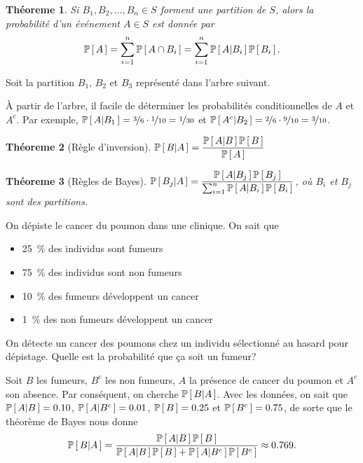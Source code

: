 \documentclass[11pt]{article}
\renewcommand\P[1]{%
	\ensuremath{%
		\mathbb{P}\left[\,#1\,\right]%
	}%
}%
\newcommand\Pg[2]{%
	\ensuremath{%
		\mathbb{P}\left[\,#1\middle\rvert#2\,\right]%
	}%
}%
\newtheorem{theoreme}{Théoreme}[section]
\theoremstyle{remark}
\theoremstyle{definition}
\begin{document}
\begin{theoreme}
	Si $B_1,B_2,\dots,B_n\in S$ forment une partition de $S$, alors la
	probabilité d'un événement $A\in S$ est donnée par
	\begin{equation*}
		\P{A}=\sum_{i=1}^n\P{A\cap B_i}=\sum_{i=1}^n\Pg{A}{B_i}\P{B_i}.
	\end{equation*}
\end{theoreme}

\begin{exemple}
	Soit la partition $B_1$, $B_2$ et $B_3$ représenté dans l'arbre suivant.
	\begin{figure}[H]
		\centering
		
	\end{figure}

	À partir de l'arbre, il facile de déterminer les probabilités
	conditionnelles de $A$ et $A^c$. Par exemple,
	$\Pg{A}{B_1}=\nicefrac{3}{6}\cdot\nicefrac{1}{10}=\nicefrac{1}{30}$ et
	$\Pg{A^c}{B_2}=\nicefrac{2}{6}\cdot\nicefrac{9}{10}=\nicefrac{3}{10}$.
\end{exemple}

\begin{theoreme}[Règle d'inversion]
	$\Pg{B}{A}=\dfrac{\Pg{A}{B}\P{B}}{\P{A}}$
\end{theoreme}

\begin{theoreme}[Règles de Bayes]
	$\Pg{B_j}{A}=\dfrac{\Pg{A}{B_j}\P{B_j}}{\sum_{i=1}^n\Pg{A}{B_i}\P{B_i}}$, où $B_i$ et
	$B_j$ sont des partitions.
\end{theoreme}

\begin{exemple}
	On dépiste le cancer du poumon dans une clinique. On sait que 
	\begin{itemize}
		\item\SI{25}{\percent} des individus sont fumeurs
		\item\SI{75}{\percent} des individus sont non fumeurs
		\item\SI{10}{\percent} des fumeurs développent un cancer
		\item\SI{1 }{\percent} des non fumeurs développent un cancer
	\end{itemize}

	On détecte un cancer des poumons chez un individu sélectionné au hasard
	pour dépistage. Quelle est la probabilité que ça soit un fumeur?

	Soit $B$ les fumeurs, $B^c$ les non fumeurs, $A$ la présence de cancer du
	poumon et $A^c$ son absence. Par conséquent, on cherche $\Pg{B}{A}$. Avec les
	données, on sait que $\Pg{A}{B}=\SI{0.10}{}$, $\Pg{A}{B^c}=\SI{0.01}{}$,
	$\P{B}=\SI{0.25}{}$ et $\P{B^c}=\SI{0.75}{}$, de sorte que le théorème de
	Bayes nous donne
	\begin{equation*}
		\Pg{B}{A}
		=\frac{\Pg{A}{B}\P{B}}{\Pg{A}{B}\P{B}+\Pg{A}{B^c}\P{B^c}}
		\approx\SI{0.769}{}.
	\end{equation*}
\end{exemple}
\end{document}

